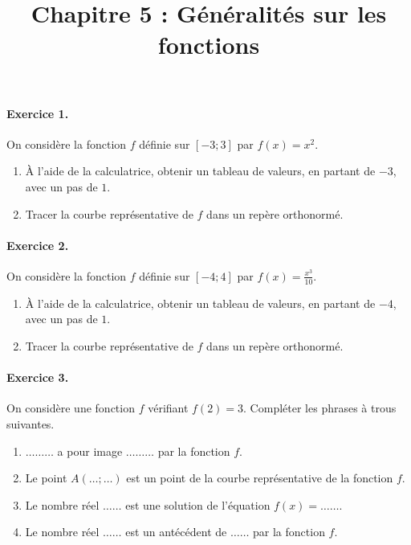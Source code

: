 \documentclass[11pt]{article}
\title{Chapitre 5 : Généralités sur les fonctions}
\date{}
\author{}
\begin{document}

\paragraph{Exercice 1.} On considère la fonction $f$ définie sur $[-3;3]$ par
$f(x)=x^2$.
\begin{enumerate}
  \item À l'aide de la calculatrice, obtenir un tableau de valeurs, en partant
    de $-3$, avec un pas de $1$.
  \item Tracer la courbe représentative de $f$ dans un repère orthonormé.
\end{enumerate}

\paragraph{Exercice 2.} On considère la fonction $f$ définie sur $[-4;4]$ par
$f(x)=\frac{x^3}{10}$.
\begin{enumerate}
  \item À l'aide de la calculatrice, obtenir un tableau de valeurs, en partant
    de $-4$, avec un pas de $1$.
  \item Tracer la courbe représentative de $f$ dans un repère orthonormé.
\end{enumerate}

\paragraph{Exercice 3.} On considère une fonction $f$ vérifiant $f(2)=3$.
Compléter les phrases à trous suivantes.
\begin{enumerate}
  \item $\dots\dots\dots$ a pour image $\dots\dots\dots$ par la fonction $f$.
  \item Le point $A(\dots;\dots)$ est un point de la courbe représentative de la
    fonction $f$.
  \item Le nombre réel $\dots\dots$ est une solution de l'équation
    $f(x)=\dots\dots$.
  \item Le nombre réel $\dots\dots$ est un antécédent de $\dots\dots$ par la
    fonction $f$.
\end{enumerate}
\end{document}
